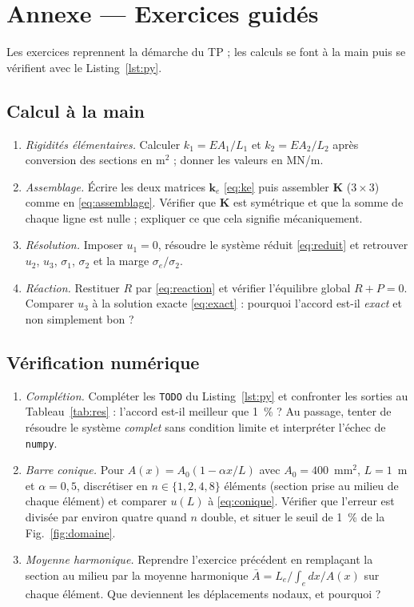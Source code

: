 \documentclass[10pt,journal]{IEEEtran}
\begin{document}
\appendices
\section*{Annexe --- Exercices guidés}
Les exercices reprennent la démarche du TP ; les calculs se font à la main puis se vérifient avec le Listing~\ref{lst:py}.

\subsection{Calcul à la main}
\begin{enumerate}[leftmargin=1.4em]
\item \emph{Rigidités élémentaires.} Calculer $k_1 = EA_1/L_1$ et $k_2 = EA_2/L_2$ après conversion des sections en m$^2$ ; donner les valeurs en MN/m.
\item \emph{Assemblage.} Écrire les deux matrices $\mathbf{k}_e$ \eqref{eq:ke} puis assembler $\mathbf{K}$ ($3\times 3$) comme en \eqref{eq:assemblage}. Vérifier que $\mathbf{K}$ est symétrique et que la somme de chaque ligne est nulle ; expliquer ce que cela signifie mécaniquement.
\item \emph{Résolution.} Imposer $u_1=0$, résoudre le système réduit \eqref{eq:reduit} et retrouver $u_2$, $u_3$, $\sigma_1$, $\sigma_2$ et la marge $\sigma_e/\sigma_2$.
\item \emph{Réaction.} Restituer $R$ par \eqref{eq:reaction} et vérifier l'équilibre global $R+P=0$. Comparer $u_3$ à la solution exacte \eqref{eq:exact} : pourquoi l'accord est-il \emph{exact} et non simplement bon ?
\end{enumerate}

\subsection{Vérification numérique}
\begin{enumerate}[leftmargin=1.4em]
\item \emph{Complétion.} Compléter les \texttt{TODO} du Listing~\ref{lst:py} et confronter les sorties au Tableau~\ref{tab:res} : l'accord est-il meilleur que 1~\% ? Au passage, tenter de résoudre le système \emph{complet} sans condition limite et interpréter l'échec de \texttt{numpy}.
\item \emph{Barre conique.} Pour $A(x)=A_0(1-\alpha x/L)$ avec $A_0=400$~mm$^2$, $L=1$~m et $\alpha=0{,}5$, discrétiser en $n\in\{1,2,4,8\}$ éléments (section prise au milieu de chaque élément) et comparer $u(L)$ à \eqref{eq:conique}. Vérifier que l'erreur est divisée par environ quatre quand $n$ double, et situer le seuil de 1~\% de la Fig.~\ref{fig:domaine}.
\item \emph{Moyenne harmonique.} Reprendre l'exercice précédent en remplaçant la section au milieu par la moyenne harmonique $\bar A = L_e\big/\!\int_e dx/A(x)$ sur chaque élément. Que deviennent les déplacements nodaux, et pourquoi ?
\end{enumerate}
\end{document}
